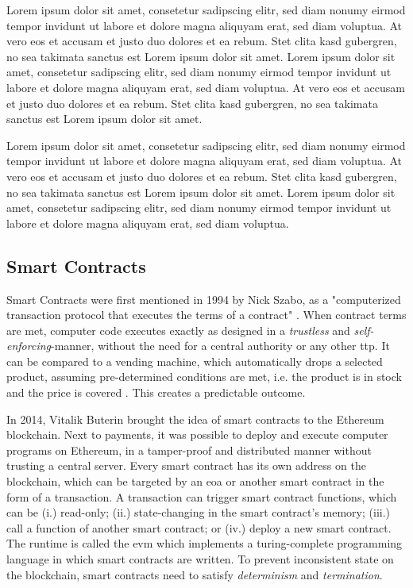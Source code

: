 Lorem ipsum dolor sit amet, consetetur sadipscing elitr, sed diam nonumy eirmod tempor invidunt ut labore et dolore magna aliquyam erat, sed diam voluptua. At vero eos et accusam et justo duo dolores et ea rebum. Stet clita kasd gubergren, no sea takimata sanctus est Lorem ipsum dolor sit amet. Lorem ipsum dolor sit amet, consetetur sadipscing elitr, sed diam nonumy eirmod tempor invidunt ut labore et dolore magna aliquyam erat, sed diam voluptua. At vero eos et accusam et justo duo dolores et ea rebum. Stet clita kasd gubergren, no sea takimata sanctus est Lorem ipsum dolor sit amet.

Lorem ipsum dolor sit amet, consetetur sadipscing elitr, sed diam nonumy eirmod tempor invidunt ut labore et dolore magna aliquyam erat, sed diam voluptua. At vero eos et accusam et justo duo dolores et ea rebum. Stet clita kasd gubergren, no sea takimata sanctus est Lorem ipsum dolor sit amet. Lorem ipsum dolor sit amet, consetetur sadipscing elitr, sed diam nonumy eirmod tempor invidunt ut labore et dolore magna aliquyam erat, sed diam voluptua.

\subsection{Smart Contracts}
\label{subsec:sc}

Smart Contracts were first mentioned in 1994 by Nick Szabo, as a "computerized transaction protocol that executes the terms of a contract" \cite{Szabo_1997}. When contract terms are met, computer code executes exactly as designed in a \emph{trustless} and \emph{self-enforcing}-manner, without the need for a central authority or any other \acrshort{ttp}. It can be compared to a vending machine, which automatically drops a selected product, assuming pre-determined conditions are met, i.e. the product is in stock and the price is covered \cite{Szabo_1997}. This creates a predictable outcome.

In 2014, Vitalik Buterin \cite{buterinNEXTGENERATIONSMART} brought the idea of smart contracts to the Ethereum blockchain. Next to payments, it was possible to deploy and execute computer programs on Ethereum, in a tamper-proof and distributed manner without trusting a central server. Every smart contract has its own address on the blockchain, which can be targeted by an \acrfull{eoa} or another smart contract in the form of a transaction. A transaction can trigger smart contract functions, which can be (i.) read-only; (ii.) state-changing in the smart contract's memory; (iii.) call a function of another smart contract; or (iv.) deploy a new smart contract. The runtime is called the \acrfull{evm} which implements a turing-complete programming language in which smart contracts are written. To prevent inconsistent state on the blockchain, smart contracts need to satisfy \emph{determinism} and \emph{termination}.

